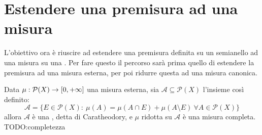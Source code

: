 \section{Estendere una premisura ad una misura}
L'obiettivo ora è riuscire ad estendere una premisura definita su un semianello ad una misura su una \sigalg{}. Per fare questo il percorso sarà prima quello di estendere la premisura ad una misura esterna, per poi ridurre questa ad una misura canonica.


\begin{theorem}\label{RiduzionePreCaratheodory}
	Data $\mu:\mathcal P(X)\to [0,+\infty]$ una misura esterna, sia $\mathcal A\subseteq \mathcal P(X)$ l'insieme così definito:
	\begin{equation*}
		\mathcal A=\{E\in\mathcal P(X):\ \mu(A)=\mu(A\cap E)+\mu(A\setminus E)\ \forall A\in \mathcal P(X)\}
	\end{equation*}
	allora $\mathcal A$ è una \sigalg{}, detta \sigalg{} di Caratheodory, e $\mu$ ridotta su $\mathcal A$ è una misura completa. TODO:completezza
\end{theorem}
